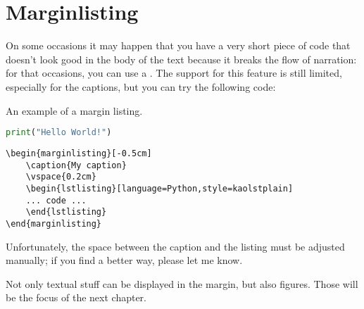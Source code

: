 \section{Marginlisting}

On some occasions it may happen that you have a very short piece of code 
that doesn't look good in the body of the text because it breaks the 
flow of narration: for that occasions, you can use a 
. The support for this feature is still 
limited, especially for the captions, but you can try the following 
code:

\begin{marginlisting}[-1.35cm]
	\caption{An example of a margin listing.}
	\vspace{0.6cm}
	\begin{lstlisting}[language=Python,style=kaolstplain]
print("Hello World!")
	\end{lstlisting}
\end{marginlisting}

\begin{verbatim}
\begin{marginlisting}[-0.5cm]
	\caption{My caption}
	\vspace{0.2cm}
	\begin{lstlisting}[language=Python,style=kaolstplain]
	... code ...
	\end{lstlisting}
\end{marginlisting}
\end{verbatim}

Unfortunately, the space between the caption and the listing must be 
adjusted manually; if you find a better way, please let me know.

Not only textual stuff can be displayed in the margin, but also figures. 
Those will be the focus of the next chapter.
